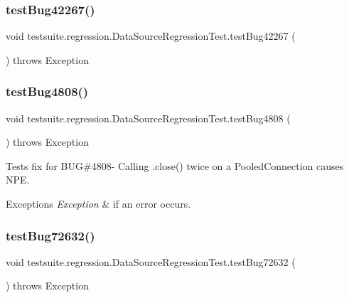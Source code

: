 \subsubsection{\texorpdfstring{test\+Bug42267()}{testBug42267()}}
{\footnotesize\ttfamily void testsuite.\+regression.\+Data\+Source\+Regression\+Test.\+test\+Bug42267 (\begin{DoxyParamCaption}{ }\end{DoxyParamCaption}) throws Exception}

\mbox{\label{classtestsuite_1_1regression_1_1_data_source_regression_test_a549c69563bb8fff0dbc64c72d6867f69}} 
\subsubsection{\texorpdfstring{test\+Bug4808()}{testBug4808()}}
{\footnotesize\ttfamily void testsuite.\+regression.\+Data\+Source\+Regression\+Test.\+test\+Bug4808 (\begin{DoxyParamCaption}{ }\end{DoxyParamCaption}) throws Exception}

Tests fix for B\+UG\#4808-\/ Calling .close() twice on a Pooled\+Connection causes N\+PE.


\begin{DoxyExceptions}{Exceptions}
{\em Exception} & if an error occurs. \\
\hline
\end{DoxyExceptions}
\mbox{\label{classtestsuite_1_1regression_1_1_data_source_regression_test_abba082ff766209732ff52f20bfe77cae}} 
\subsubsection{\texorpdfstring{test\+Bug72632()}{testBug72632()}}
{\footnotesize\ttfamily void testsuite.\+regression.\+Data\+Source\+Regression\+Test.\+test\+Bug72632 (\begin{DoxyParamCaption}{ }\end{DoxyParamCaption}) throws Exception}

